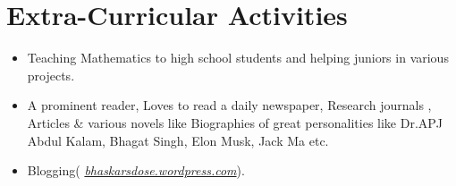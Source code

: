 \documentclass[10pt]{report}
\begin{document}
\section*{\color{BlueViolet}\faPencil\hspace{1pt} Extra-Curricular Activities} %
\begin{itemize}
	\item Teaching Mathematics to high school students and helping juniors in various projects.
	\item A prominent reader, Loves to read a daily newspaper, Research journals , Articles \& various novels like Biographies of great personalities like Dr.APJ Abdul Kalam, Bhagat Singh, Elon Musk, Jack Ma etc.
    \item Blogging( \href{https://bhaskarsdose.wordpress.com/}{\color{gray}\textit{bhaskarsdose.wordpress.com}}).
\end{itemize}
\end{document}
